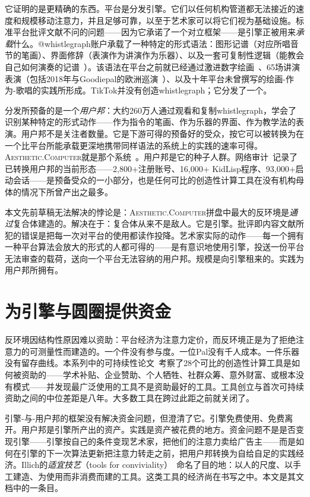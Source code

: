 \documentclass[10pt,letterpaper,twocolumn]{article}
\newcommand{\ac}{\textsc{Aesthetic.Computer}}
\begin{document}
它证明的是更精确的东西。平台是分发引擎。它们以任何机构管道都无法接近的速度和规模移动注意力，并且足够可靠，以至于艺术家可以将它们视为基础设施。标准平台批评文献不问的问题——因为它承诺了一个对立框架——是引擎正被用来\emph{承载}什么。@whistlegraph账户承载了一种特定的形式语法：图形记谱（对应所唱音节的笔画）、界面修辞（表演作为讲演作为乐器）、以及一套可复制性逻辑（能教会自己如何演奏的记谱~\citep{scudder2026whistlegraph}）。该语法在平台之前就已经通过激进数字绘画~\citep{scudder2017manifesto, scudder2018rdp35c3}、65场讲演表演（包括2018年与Goodiepal的欧洲巡演~\citep{scudder2026goodiepal}）、以及十年平台未曾撰写的绘画-作为-歌唱的实践所形成。TikTok并没有创造whistlegraph；它分发了一个。

分发所预备的是一个\emph{用户邦}：大约260万人通过观看和复制whistlegraph，学会了识别某种特定的形式动作——作为指令的笔画、作为乐器的界面、作为教学法的表演。用户邦不是关注者数量。它是下游可得的预备好的受众，按它可以被转换为在一个比平台所能承载更深地携带同样语法的系统上的实践的速率可得。\ac{}就是那个系统~\citep{scudder2026ac}。用户邦是它的种子人群。网络审计~\citep{scudder2026audit}记录了已转换用户邦的当前形态——2,800+注册账号、16,000+ KidLisp程序、93,000+启动会话——是预备受众的一小部分，也是任何可比的创造性计算工具在没有机构母体的情况下所曾产出之最多。

本文先前草稿无法解决的悖论是：\ac{}拼盘中最大的反环境是\emph{通过}复合体建造的。解决在于：复合体从来不是敌人。它是引擎。批评即内容文献所犯的错误是把每一次对平台的使用都读作投降。艺术家实际的动作——每一个拥有一种平台算法会放大的形式的人都可得的——是有意识地使用引擎，投送一份平台无法审查的载荷，送向一个平台无法容纳的用户邦。规模是向引擎租来的。实践为用户邦所拥有。

\section{为引擎与圆圈提供资金}

反环境因结构性原因难以资助：平台经济为注意力定价，而反环境正是为了拒绝注意力的可测量性而建造的。一个件没有参与度。一位Pal没有千人成本。一件乐器没有留存曲线。本系列中的可持续性论文~\citep{scudder2026sustainability}考察了28个可比的创造性计算工具是如何被资助的——学术补贴、企业赞助、个人牺牲、社群众筹、意外财富、或根本没有模式——并发现最广泛使用的工具不是资助最好的工具。工具创立与首次可持续资助之间的中位差距是八年。大多数工具在跨过此距之前就关闭了。

引擎-与-用户邦的框架没有解决资金问题，但澄清了它。引擎免费使用、免费离开。用户邦是引擎所产出的资产。实践是资产被花费的地方。资金问题不是是否变现引擎——引擎按自己的条件变现艺术家，把他们的注意力卖给广告主——而是如何在引擎的下一次算法更新把注意力转走之前，把用户邦转换为自给自足的实践经济。Illich的\emph{适宜技艺}（tools for conviviality）~\citep{illich1973tools}命名了目的地：以人的尺度、以手工建造、为使用而非消费而建的工具。这类工具的经济尚在书写之中。本文是其文档中的一条目。
\end{document}
